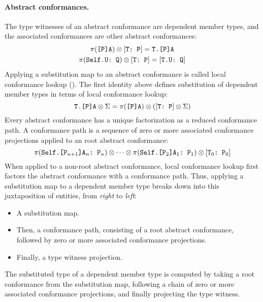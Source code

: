 \documentclass[../generics]{subfiles}
\begin{document}
\paragraph{Abstract conformances.} The type witnesses of an abstract conformance are dependent member types, and the associated conformances are other abstract conformances:
\begin{gather*}
\pi(\texttt{[P]A}) \otimes [\texttt{T:~P}] = \texttt{T.[P]A}\\
\pi(\texttt{Self.U:~Q}) \otimes [\texttt{T:~P}] = [\texttt{T.U:~Q}]
\end{gather*}
Applying a substitution map to an abstract conformance is called local conformance lookup (). The first identity above defines substitution of dependent member types in terms of local conformance lookup:
\[\texttt{T.[P]A} \otimes \Sigma = \pi(\texttt{[P]A}) \otimes ([\texttt{T:~P}] \otimes \Sigma)\]
Every abstract conformance has a unique factorization as a reduced conformance path. A conformance path is a sequence of zero or more associated conformance projections applied to an root abstract conformance:
\[
\pi(\texttt{Self.[$\texttt{P}_{n+1}$]$\texttt{A}_n$:~$\texttt{P}_n$})
\otimes
\cdots
\otimes
\pi(\texttt{Self.[$\texttt{P}_2$]$\texttt{A}_1$:~$\texttt{P}_1$})
\otimes
[\texttt{$\texttt{T}_0$:~$\texttt{P}_0$}]
\]
When applied to a non-root abstract conformance, local conformance lookup first factors the abstract conformance with a conformance path. Thus, applying a substitution map to a dependent member type breaks down into this juxtaposition of entities, from \emph{right} to \emph{left}:
\begin{itemize}
\item A substitution map.
\item Then, a conformance path, consisting of a root abstract conformance, followed by zero or more associated conformance projections.
\item Finally, a type witness projection.
\end{itemize}
The substituted type of a dependent member type is computed by taking a root conformance from the substitution map, following a chain of zero or more associated conformance projections, and finally projecting the type witness.
\end{document}
